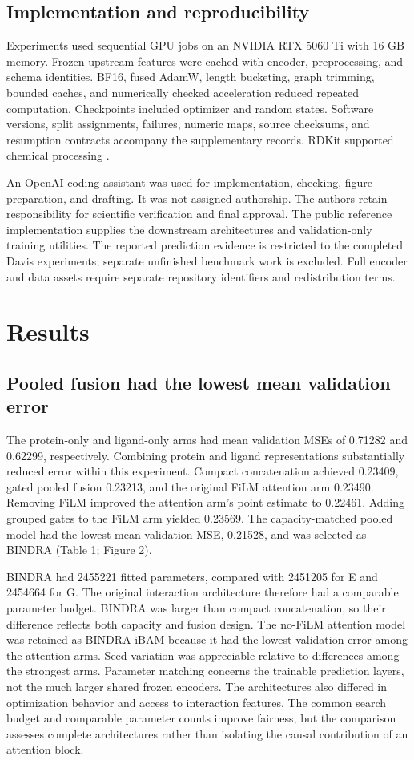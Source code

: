 \documentclass[12pt,a4paper]{article}
\begin{document}
\subsection*{Implementation and reproducibility}
Experiments used sequential GPU jobs on an NVIDIA RTX 5060 Ti with 16 GB memory. Frozen upstream features were cached with encoder, preprocessing, and schema identities. BF16, fused AdamW, length bucketing, graph trimming, bounded caches, and numerically checked acceleration reduced repeated computation. Checkpoints included optimizer and random states. Software versions, split assignments, failures, numeric maps, source checksums, and resumption contracts accompany the supplementary records. RDKit supported chemical processing \citep{rdkit}.

An OpenAI coding assistant was used for implementation, checking, figure preparation, and drafting. It was not assigned authorship. The authors retain responsibility for scientific verification and final approval. The public reference implementation supplies the downstream architectures and validation-only training utilities. The reported prediction evidence is restricted to the completed Davis experiments; separate unfinished benchmark work is excluded. Full encoder and data assets require separate repository identifiers and redistribution terms.

\section*{Results}
\subsection*{Pooled fusion had the lowest mean validation error}
The protein-only and ligand-only arms had mean validation MSEs of 0.71282 and 0.62299, respectively. Combining protein and ligand representations substantially reduced error within this experiment. Compact concatenation achieved 0.23409, gated pooled fusion 0.23213, and the original FiLM attention arm 0.23490. Removing FiLM improved the attention arm's point estimate to 0.22461. Adding grouped gates to the FiLM arm yielded 0.23569. The capacity-matched pooled model had the lowest mean validation MSE, 0.21528, and was selected as BINDRA (Table 1; Figure 2).

BINDRA had 2455221 fitted parameters, compared with 2451205 for E and 2454664 for G. The original interaction architecture therefore had a comparable parameter budget. BINDRA was larger than compact concatenation, so their difference reflects both capacity and fusion design. The no-FiLM attention model was retained as BINDRA-iBAM because it had the lowest validation error among the attention arms. Seed variation was appreciable relative to differences among the strongest arms. Parameter matching concerns the trainable prediction layers, not the much larger shared frozen encoders. The architectures also differed in optimization behavior and access to interaction features. The common search budget and comparable parameter counts improve fairness, but the comparison assesses complete architectures rather than isolating the causal contribution of an attention block.
\end{document}

